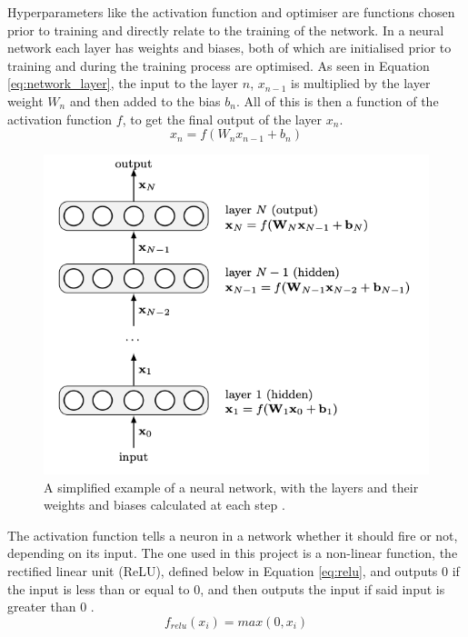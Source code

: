 \documentclass[12pt, onecolumn]{aa}
\begin{document}
Hyperparameters like the activation function and optimiser are functions chosen prior to training and directly relate to the training of the network. In a neural network each layer has weights and biases, both of which are initialised prior to training and during the training process are optimised. As seen in Equation \ref{eq:network_layer}, the input to the layer $n$, $x_{n-1}$ is multiplied by the layer weight $W_n$ and then added to the bias $b_n$. All of this is then a function of the activation function $f$, to get the final output of the layer $x_n$.
\begin{equation}
    x_n = f(W_n x_{n-1} + b_n)
    \label{eq:network_layer}
\end{equation}
\begin{figure}
    \centering
    \includegraphics[width=\linewidth]{Figures/feed_forward_network.png}
    \caption{A simplified example of a neural network, with the layers and their weights and biases calculated at each step \citep{DielemanS2015}.}
    \label{fig:feed_forward}
\end{figure}
The activation function tells a neuron in a network whether it should fire or not, depending on its input. The one used in this project is a non-linear function, the rectified linear unit (ReLU), defined below in Equation \ref{eq:relu}, and outputs 0 if the input is less than or equal to 0, and then outputs the input if said input is greater than 0 \citep{Geron2017}.
\begin{equation}\label{eq:relu}
    f_{relu}(x_i) = max(0,x_i)
\end{equation}
\end{document}
